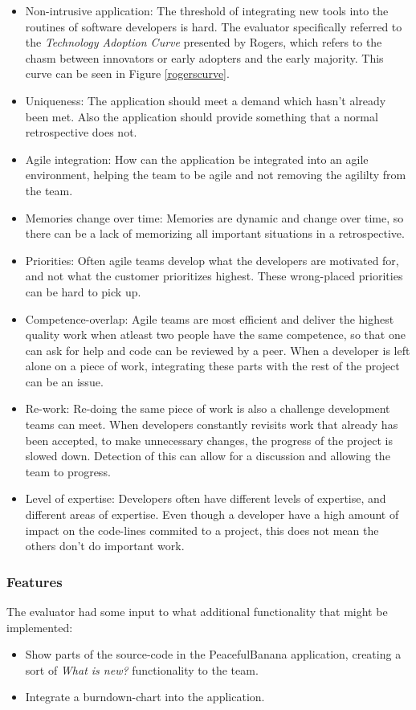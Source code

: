 \begin{itemize}
	\item Non-intrusive application: The threshold of integrating new tools into the routines of software developers is hard. The evaluator specifically referred to the \emph{Technology Adoption Curve} presented by Rogers\cite{rogers2010diffusion}, which refers to the chasm between innovators or early adopters and the early majority. This curve can be seen in Figure \ref{rogerscurve}.
	\item Uniqueness: The application should meet a demand which hasn't already been met. Also the application should provide something that a normal retrospective does not.
	\item Agile integration: How can the application be integrated into an agile environment, helping the team to be agile and not removing the agililty from the team. 
	\item Memories change over time: Memories are dynamic and change over time, so there can be a lack of memorizing all important situations in a retrospective. 
	\item Priorities: Often agile teams develop what the developers are motivated for, and not what the customer prioritizes highest. These wrong-placed priorities can be hard to pick up. 
	\item Competence-overlap: Agile teams are most efficient and deliver the highest quality work when atleast two people have the same competence, so that one can ask for help and code can be reviewed by a peer. When a developer is left alone on a piece of work, integrating these parts with the rest of the project can be an issue.
	\item Re-work: Re-doing the same piece of work is also a challenge development teams can meet. When developers constantly revisits work that already has been accepted, to make unnecessary changes, the progress of the project is slowed down. Detection of this can allow for a discussion and allowing the team to progress.
	\item Level of expertise: Developers often have different levels of expertise, and different areas of expertise. Even though a developer have a high amount of impact on the code-lines commited to a project, this does not mean the others don't do important work. 
\end{itemize}

\subsubsection{Features}
The evaluator had some input to what additional functionality that might be implemented: 
\begin{itemize}
	\item Show parts of the source-code in the PeacefulBanana application, creating a sort of \emph{What is new?} functionality to the team. 
	\item Integrate a burndown-chart into the application. 
\end{itemize}

